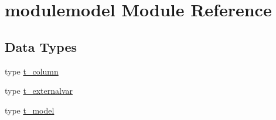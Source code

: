 \hypertarget{namespacemodulemodel}{}\section{modulemodel Module Reference}
\label{namespacemodulemodel}
\subsection*{Data Types}
\begin{DoxyCompactItemize}
\item 
type \mbox{\hyperlink{structmodulemodel_1_1t__column}{t\+\_\+column}}
\item 
type \mbox{\hyperlink{structmodulemodel_1_1t__externalvar}{t\+\_\+externalvar}}
\item 
type \mbox{\hyperlink{structmodulemodel_1_1t__model}{t\+\_\+model}}
\end{DoxyCompactItemize}
